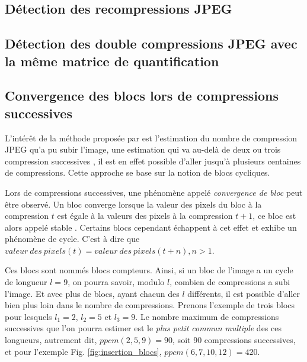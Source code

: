 \documentclass[utf8]{stageM2R} %
\begin{document}
\subsection{Détection des recompressions JPEG}
\cite{feng2010jpeg}

\subsection{Détection des double compressions JPEG avec la même matrice de quantification}
\cite{huang2010detecting}


\subsection{Convergence des blocs lors de compressions successives}
L'intérêt de la méthode proposée par \citeauthor{CarneinSB2016TelltaleWatermarks} \cite{CarneinSB2016TelltaleWatermarks} est l'estimation du nombre de compression JPEG qu'a pu subir l'image, une estimation qui va au-delà de deux ou trois compression successives \cite{huang2010detecting}\cite{}, il est en effet possible d'aller jusqu'à plusieurs centaines de compressions. Cette approche se base sur la notion de blocs cycliques.

Lors de compressions successives, une phénomène appelé \textit{convergence de bloc} peut être observé. Un bloc converge lorsque la valeur des pixels du bloc à la compression $t$ est égale à la valeurs des pixels à la compression $t + 1$, ce bloc est alors appelé stable \cite{lai2013block}. Certains blocs cependant échappent à cet effet et exhibe un phénomène de cycle. C'est à dire que $valeur\ des\ pixels(t) = valeur\ des\ pixels(t + n), n > 1$.

Ces blocs sont nommés blocs compteurs. Ainsi, si un bloc de l'image a un cycle de longueur $l=9$, on pourra savoir, modulo $l$, combien de compressions a subi l'image. Et avec plus de blocs, ayant chacun des $l$ différents, il est possible d'aller bien plus loin dans le nombre de compressions. Prenons l'exemple de trois blocs pour lesquels $l_{1} = 2$, $l_{2} = 5$ et $l_{3} = 9$. Le nombre maximum de compressions successives que l'on pourra estimer est le \textit{plus petit commun multiple} des ces longueurs, autrement dit, $ppcm(2, 5, 9) = 90$, soit 90 compressions successives, et pour l'exemple Fig. \ref{fig:insertion_blocs}, $ppcm(6, 7, 10, 12) = 420$.
\end{document}

